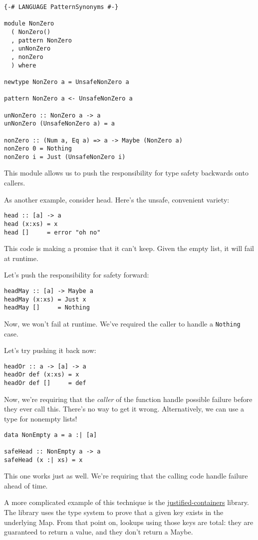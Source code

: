 \begin{verbatim}
{-# LANGUAGE PatternSynonyms #-}

module NonZero
  ( NonZero()
  , pattern NonZero
  , unNonZero
  , nonZero
  ) where

newtype NonZero a = UnsafeNonZero a

pattern NonZero a <- UnsafeNonZero a

unNonZero :: NonZero a -> a
unNonZero (UnsafeNonZero a) = a

nonZero :: (Num a, Eq a) => a -> Maybe (NonZero a)
nonZero 0 = Nothing
nonZero i = Just (UnsafeNonZero i)
\end{verbatim}
This module allows us to push the responsibility for type safety backwards onto callers.

As another example, consider head. Here's the unsafe, convenient variety:
\begin{verbatim}
head :: [a] -> a
head (x:xs) = x
head []     = error "oh no"
\end{verbatim}
This code is making a promise that it can't keep. Given the empty list, it will fail at runtime.

Let's push the responsibility for safety forward:

\begin{verbatim}
headMay :: [a] -> Maybe a
headMay (x:xs) = Just x
headMay []     = Nothing
\end{verbatim}
Now, we won't fail at runtime. We've required the caller to handle a \texttt{Nothing} case.

Let's try pushing it back now:

\begin{verbatim}
headOr :: a -> [a] -> a
headOr def (x:xs) = x
headOr def []     = def
\end{verbatim}
Now, we're requiring that the \textit{caller} of the function handle possible failure before they ever call this. There's no way to get it wrong. Alternatively, we can use a type for nonempty lists!

\begin{verbatim}
data NonEmpty a = a :| [a]

safeHead :: NonEmpty a -> a
safeHead (x :| xs) = x
\end{verbatim}
This one works just as well. We're requiring that the calling code handle failure ahead of time.

A more complicated example of this technique is the \href{https://hackage.haskell.org/package/justified-containers-0.1.2.0/docs/Data-Map-Justified-Tutorial.html}{justified-containers} library. The library uses the type system to prove that a given key exists in the underlying Map. From that point on, lookups using those keys are total: they are guaranteed to return a value, and they don't return a Maybe.

